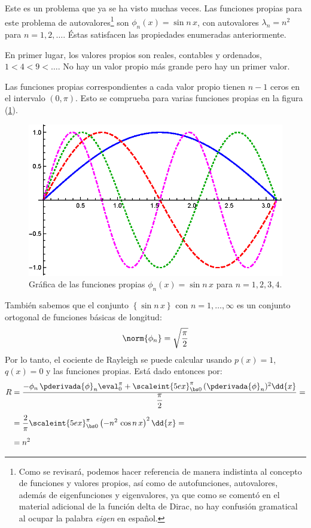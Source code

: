 Este es un problema que ya se ha visto muchas veces. Las funciones propias para este problema de autovalores\footnote{Como se revisará, podemos hacer referencia de manera indistinta al concepto de funciones y valores propios, así como de autofunciones, autovalores, además de eigenfunciones y eigenvalores, ya que como se comentó en el material adicional de la función delta de Dirac, no hay confusión gramatical al ocupar la palabra \emph{eigen} en español.} son $\phi_{n} (x) = \sin n\, x$, con autovalores $\lambda_{n} = n^{2}$ para $n = 1, 2, \ldots$. Éstas satisfacen las propiedades enumeradas anteriormente.
\par
En primer lugar, los valores propios son reales, contables y ordenados, $1 < 4 < 9 < \ldots$. No hay un valor propio más grande pero hay un primer valor.
\par
Las funciones propias correspondientes a cada valor propio tienen $n -1$ ceros en el intervalo $(0, \pi)$. Esto se comprueba para varias funciones propias en la figura (\ref{fig:figura_04_01}).
\begin{figure}[H]
    \centering
    \includegraphics[scale=1.3]{Imagenes/Eigenfunciones_Sin_nx.eps}
    \caption{Gráfica de las funciones propias $\phi_{n} (x) = \sin n \,x$ para $n = 1, 2, 3, 4$.}
    \label{fig:figura_04_01}
\end{figure}
También sabemos que el conjunto $\left\{ \sin n \, x \right\}$ con $n = 1, \ldots, \infty$ es un conjunto ortogonal de funciones básicas de longitud:
\begin{align*}
\norm{\phi_{n}} = \sqrt{\dfrac{\pi}{2}}
\end{align*}
Por lo tanto, el cociente de Rayleigh se puede calcular usando $p(x) = 1$, $q (x) = 0$ y las funciones propias. Está dado entonces por:
\begin{align}
\begin{aligned}[b]
R &= \dfrac{- \phi_{n} \, \pderivada{\phi}_{n} \eval_{0}^{\pi} + \scaleint{5ex}_{\bs 0}^{\pi} \, (\pderivada{\phi}_{n})^{2} \dd{x}}{\dfrac{\pi}{2}} = \\[0.5em]
&= \dfrac{2}{\pi} \scaleint{5ex}_{\bs 0}^{\pi} \left( - n^{2} \, \cos n \, x \right)^{2} \dd{x} = \\[0.5em]
&= n^{2}
\end{aligned}
\label{eq:ecuacion_04_13}
\end{align}
